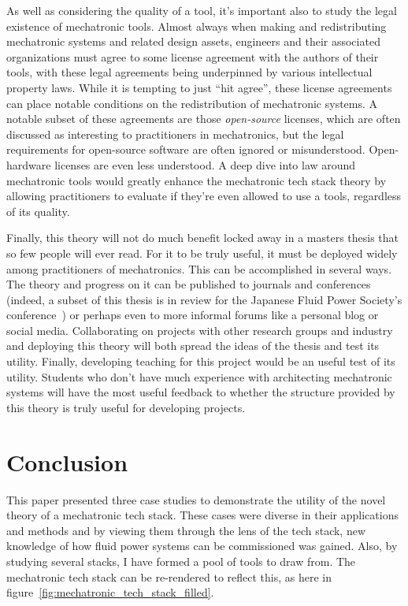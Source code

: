 \documentclass[english,12pt,a4paper,pdftex,eng,utf8]{aaltothesis}
\begin{document}
As well as considering the quality of a tool, it's important also to study the legal existence of mechatronic tools.  Almost always when making and redistributing mechatronic systems and related design assets, engineers and their associated organizations must agree to some license agreement with the authors of their tools, with these legal agreements being underpinned by various intellectual property laws.  While it is tempting to just ``hit agree'', these license agreements can place notable conditions on the redistribution of mechatronic systems.  A notable subset of these agreements are those \textit{open-source} licenses, which are often discussed as interesting to practitioners in mechatronics, but the legal requirements for open-source software are often ignored or misunderstood.  Open-hardware licenses are even less understood.  A deep dive into law around mechatronic tools would greatly enhance the mechatronic tech stack theory by allowing practitioners to evaluate if they're even allowed to use a tools, regardless of its quality.

Finally, this theory will not do much benefit locked away in a masters thesis that so few people will ever read.  For it to be truly useful, it must be deployed widely among practitioners of mechatronics.  This can be accomplished in several ways.  The theory and progress on it can be published to journals and conferences (indeed, a subset of this thesis is in review for the Japanese Fluid Power Society's conference~\cite{Porter2024}) or perhaps even to more informal forums like a personal blog or social media.  Collaborating on projects with other research groups and industry and deploying this theory will both spread the ideas of the thesis and test its utility.  Finally, developing teaching for this project would be an useful test of its utility.  Students who don't have much experience with architecting mechatronic systems will have the most useful feedback to whether the structure provided by this theory is truly useful for developing projects.

\clearpage


\section{Conclusion}

This paper presented three case studies to demonstrate the utility of the novel theory of a mechatronic tech stack. These cases were diverse in their applications and methods and by viewing them through the lens of the tech stack, new knowledge of how fluid power systems can be commissioned was gained. Also, by studying several stacks, I have formed a pool of tools to draw from. The mechatronic tech stack can be re-rendered to reflect this, as here in figure~\ref{fig:mechatronic_tech_stack_filled}.
\end{document}
